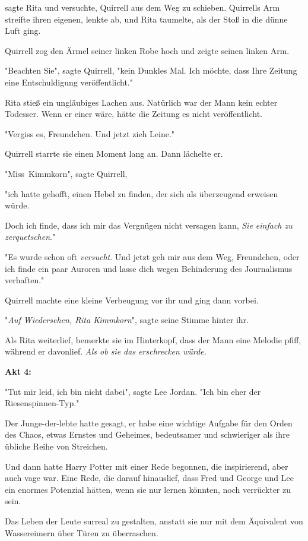 {sagte Rita und versuchte, Quirrell aus dem Weg zu schieben. Quirrells Arm streifte ihren eigenen, lenkte ab, und Rita taumelte, als der Stoß in die dünne Luft ging.

Quirrell zog den Ärmel seiner linken Robe hoch und zeigte seinen linken Arm.

"Beachten Sie", sagte Quirrell, "kein Dunkles Mal. Ich möchte, dass Ihre Zeitung eine Entschuldigung veröffentlicht."

Rita stieß ein ungläubiges Lachen aus. Natürlich war der Mann kein echter Todesser. Wenn er einer wäre, hätte die Zeitung es nicht veröffentlicht.

"Vergiss es, Freundchen. Und jetzt zieh Leine."

Quirrell starrte sie einen Moment lang an. Dann lächelte er.

"Miss~Kimmkorn", sagte Quirrell,

"ich hatte gehofft, einen Hebel zu finden, der sich als überzeugend erweisen würde.

Doch ich finde, dass ich mir das Vergnügen nicht versagen kann, \emph{Sie einfach zu zerquetschen}."

"Es wurde schon oft \emph{versucht}. Und jetzt geh mir aus dem Weg, Freundchen, oder ich finde ein paar Auroren und lasse dich wegen Behinderung des Journalismus verhaften."

Quirrell machte eine kleine Verbeugung vor ihr und ging dann vorbei.

"\emph{Auf Wiedersehen, Rita Kimmkorn}", sagte seine Stimme hinter ihr.

Als Rita weiterlief, bemerkte sie im Hinterkopf, dass der Mann eine Melodie pfiff, während er davonlief. \emph{Als ob sie das erschrecken würde.}

\textbf{Akt 4:}

"Tut mir leid, ich bin nicht dabei", sagte Lee Jordan. "Ich bin eher der Riesenspinnen-Typ."

Der Junge-der-lebte hatte gesagt, er habe eine wichtige Aufgabe für den Orden des Chaos, etwas Ernstes und Geheimes, bedeutsamer und schwieriger als ihre übliche Reihe von Streichen.

Und dann hatte Harry Potter mit einer Rede begonnen, die inspirierend, aber auch vage war. Eine Rede, die darauf hinauslief, dass Fred und George und Lee ein enormes Potenzial hätten, wenn sie nur lernen könnten, noch verrückter zu sein.

Das Leben der Leute surreal zu gestalten, anstatt sie nur mit dem Äquivalent von Wassereimern über Türen zu überraschen.

}
